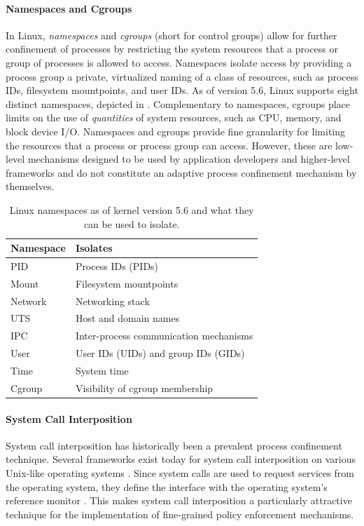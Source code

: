 \documentclass[dvipsnames, 12pt]{article}
\begin{document}
\paragraph*{Namespaces and Cgroups} In Linux, \textit{namespaces} and
\textit{cgroups} (short for control groups) allow for further confinement of
processes by restricting the system resources that a process or group of
processes is allowed to access. Namespaces isolate access by providing a process
group a private, virtualized naming of a class of resources, such as process
IDs, filesystem mountpoints, and user IDs. As of version 5.6, Linux supports
eight distinct namespaces, depicted in .  Complementary to
namespaces, cgroups place limits on the use of \textit{quantities} of system
resources, such as CPU, memory, and block device I/O.  Namespaces and cgroups
provide fine granularity for limiting the resources that a process or process
group can access. However, these are low-level mechanisms designed to be used by
application developers and higher-level frameworks and do not constitute an
adaptive process confinement mechanism by themselves.

\begin{table}
\begin{tabular}{lp{3in}}
    \toprule
    Namespace & Isolates \\
    \midrule
    \multirow{1}{*}{PID} & Process IDs (PIDs)\\
    \multirow{1}{*}{Mount} & Filesystem mountpoints\\
    \multirow{1}{*}{Network} & Networking stack\\
    \multirow{1}{*}{UTS} & Host and domain names\\
    \multirow{1}{*}{IPC} & Inter-process communication mechanisms\\
    \multirow{1}{*}{User} & User IDs (UIDs) and group IDs (GIDs)\\
    \multirow{1}{*}{Time} & System time\\
    \multirow{1}{*}{Cgroup} & Visibility of cgroup membership\\
    \bottomrule
\end{tabular}
\caption{Linux namespaces as of kernel version 5.6 and what they can be used to isolate.}
\label{tab:namespaces}
\end{table}

\paragraph*{System Call Interposition} System call interposition has
historically been a prevalent process confinement technique. Several frameworks
exist today for system call interposition on various Unix-like operating systems
\cite{anderson2017_comparison, padala2002_ptrace, watson2010_capsicum, pledge}.
Since system calls are used to request services from the operating system, they
define the interface with the operating system's reference monitor
\cite{anderson1973_reference_monitor}. This makes system call interposition
a particularly attractive technique for the implementation of fine-grained
policy enforcement mechanisms.
\end{document}
